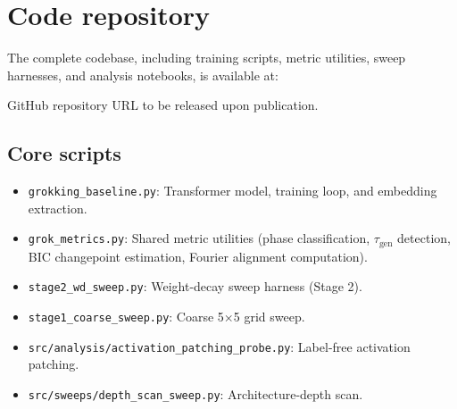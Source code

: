 \documentclass[12pt,openany,a4paper]{book}
\newcommand{\taug}{\tau_{\mathrm{gen}}}
\begin{document}
\chapter{Code repository}

The complete codebase, including training scripts, metric utilities, sweep harnesses, and analysis notebooks, is available at:

GitHub repository URL to be released upon publication.

\section{Core scripts}
\begin{itemize}
  \item \texttt{grokking\_baseline.py}: Transformer model, training loop, and embedding extraction.
  \item \texttt{grok\_metrics.py}: Shared metric utilities (phase classification, $\taug$ detection, BIC changepoint estimation, Fourier alignment computation).
  \item \texttt{stage2\_wd\_sweep.py}: Weight-decay sweep harness (Stage 2).
  \item \texttt{stage1\_coarse\_sweep.py}: Coarse 5$\times$5 grid sweep.
  \item \texttt{src/analysis/activation\_patching\_probe.py}: Label-free activation patching.
  \item \texttt{src/sweeps/depth\_scan\_sweep.py}: Architecture-depth scan.
\end{itemize}
\end{document}
